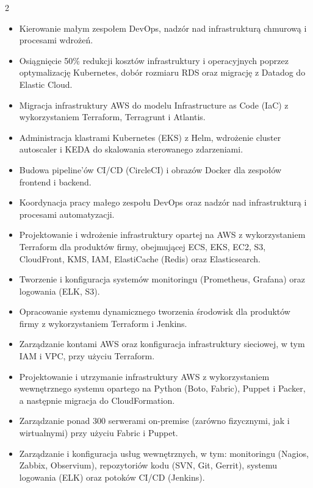 \documentclass[10pt,a4paper,ragged2e,withhyper]{altacv}
\begin{document}
\begin{paracol}{2}
\begin{itemize}
\item Kierowanie małym zespołem DevOps, nadzór nad infrastrukturą chmurową i procesami wdrożeń.
\item Osiągnięcie 50\% redukcji kosztów infrastruktury i operacyjnych poprzez optymalizację Kubernetes, dobór rozmiaru RDS oraz migrację z Datadog do Elastic Cloud.
\item Migracja infrastruktury AWS do modelu Infrastructure as Code (IaC) z wykorzystaniem Terraform, Terragrunt i Atlantis.
\item Administracja klastrami Kubernetes (EKS) z Helm, wdrożenie cluster autoscaler i KEDA do skalowania sterowanego zdarzeniami.
\item Budowa pipeline'ów CI/CD (CircleCI) i obrazów Docker dla zespołów frontend i backend.
\end{itemize}

\divider

\begin{itemize}
\item Koordynacja pracy małego zespołu DevOps oraz nadzór nad infrastrukturą i procesami automatyzacji.
\item Projektowanie i wdrożenie infrastruktury opartej na AWS z wykorzystaniem Terraform dla produktów firmy, obejmującej ECS, EKS, EC2, S3, CloudFront, KMS, IAM, ElastiCache (Redis) oraz Elasticsearch.
\item Tworzenie i konfiguracja systemów monitoringu (Prometheus, Grafana) oraz logowania (ELK, S3).
\item Opracowanie systemu dynamicznego tworzenia środowisk dla produktów firmy z wykorzystaniem Terraform i Jenkins.
\item Zarządzanie kontami AWS oraz konfiguracja infrastruktury sieciowej, w tym IAM i VPC, przy użyciu Terraform.
\end{itemize}

\divider

\begin{itemize}
\item Projektowanie i utrzymanie infrastruktury AWS z wykorzystaniem wewnętrznego systemu opartego na Python (Boto, Fabric), Puppet i Packer, a następnie migracja do CloudFormation.
\item Zarządzanie ponad 300 serwerami on-premise (zarówno fizycznymi, jak i wirtualnymi) przy użyciu Fabric i Puppet.
\item Zarządzanie i konfiguracja usług wewnętrznych, w tym: monitoringu (Nagios, Zabbix, Observium), repozytoriów kodu (SVN, Git, Gerrit), systemu logowania (ELK) oraz potoków CI/CD (Jenkins).
\end{itemize}


\end{paracol}
\end{document}
